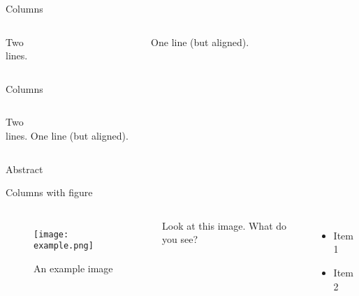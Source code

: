 \begin{frame}{Columns}
  \begin{columns}[t]
    \begin{column}{5cm}
    Two\\lines.
    \end{column}
    \begin{column}{5cm}
    One line (but aligned).
    \end{column}
  \end{columns}
\end{frame}


\begin{frame}{Columns}
  \begin{columns}
    \column[t]{5cm}
      Two\\lines.
    \column[t]{5cm}
      One line (but aligned).
  \end{columns}
\end{frame}


\begin{frame}{Abstract}
  \begin{abstract}
    This is the abstract
  \end{abstract}
\end{frame}

\begin{frame}{Columns with figure}
  \begin{columns}
      \begin{figure}
        \texttt{[image: example.png]}
        \caption[my caption]{An example image}
      \end{figure}
      Look at this image. What do you see?
      \begin{itemize}
       \item Item 1
       \item Item 2
      \end{itemize}
  \end{columns}
\end{frame}


